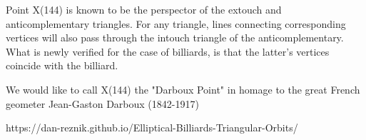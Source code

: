 Point X(144) is known to be the perspector of the extouch and anticomplementary triangles. For any triangle, lines connecting corresponding vertices will also pass through the intouch triangle of the anticomplementary. What is newly verified for the case of billiards, is that the latter's vertices coincide with the billiard.

We would like to call X(144) the "Darboux Point" in homage to the great French geometer Jean-Gaston Darboux (1842-1917)

https://dan-reznik.github.io/Elliptical-Billiards-Triangular-Orbits/